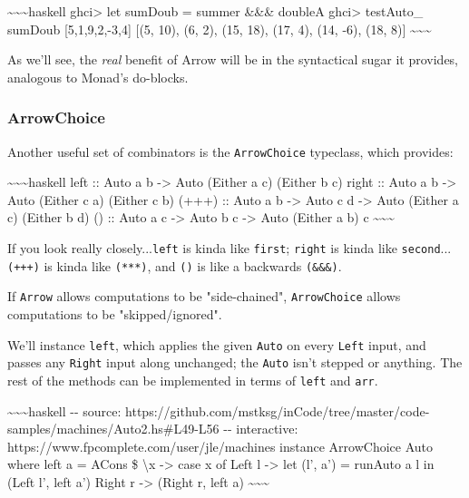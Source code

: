 \documentclass[]{article}
\begin{document}
\textasciitilde{}\textasciitilde{}\textasciitilde{}haskell ghci\textgreater{}
let sumDoub = summer \&\&\& doubleA ghci\textgreater{} testAuto\_ sumDoub
{[}5,1,9,2,-3,4{]} {[}(5, 10), (6, 2), (15, 18), (17, 4), (14, -6), (18, 8){]}
\textasciitilde{}\textasciitilde{}\textasciitilde{}

As we'll see, the \emph{real} benefit of Arrow will be in the syntactical sugar
it provides, analogous to Monad's do-blocks.

\subsubsection{ArrowChoice}

Another useful set of combinators is the \texttt{ArrowChoice} typeclass, which
provides:

\textasciitilde{}\textasciitilde{}\textasciitilde{}haskell left :: Auto a b
-\textgreater{} Auto (Either a c) (Either b c) right :: Auto a b -\textgreater{}
Auto (Either c a) (Either c b) (+++) :: Auto a b -\textgreater{} Auto c d
-\textgreater{} Auto (Either a c) (Either b d) (\textbar{}\textbar{}\textbar{})
:: Auto a c -\textgreater{} Auto b c -\textgreater{} Auto (Either a b) c
\textasciitilde{}\textasciitilde{}\textasciitilde{}

If you look really closely...\texttt{left} is kinda like \texttt{first};
\texttt{right} is kinda like \texttt{second}...\texttt{(+++)} is kinda like
\texttt{(***)}, and \texttt{(\textbar{}\textbar{}\textbar{})} is like a
backwards \texttt{(\&\&\&)}.

If \texttt{Arrow} allows computations to be "side-chained", \texttt{ArrowChoice}
allows computations to be "skipped/ignored".

We'll instance \texttt{left}, which applies the given \texttt{Auto} on every
\texttt{Left} input, and passes any \texttt{Right} input along unchanged; the
\texttt{Auto} isn't stepped or anything. The rest of the methods can be
implemented in terms of \texttt{left} and \texttt{arr}.

\textasciitilde{}\textasciitilde{}\textasciitilde{}haskell -\/- source:
https://github.com/mstksg/inCode/tree/master/code-samples/machines/Auto2.hs\#L49-L56
-\/- interactive: https://www.fpcomplete.com/user/jle/machines instance
ArrowChoice Auto where left a = ACons \$ \textbackslash{}x -\textgreater{} case
x of Left l -\textgreater{} let (l', a') = runAuto a l in (Left l', left a')
Right r -\textgreater{} (Right r, left a)
\textasciitilde{}\textasciitilde{}\textasciitilde{}
\end{document}
